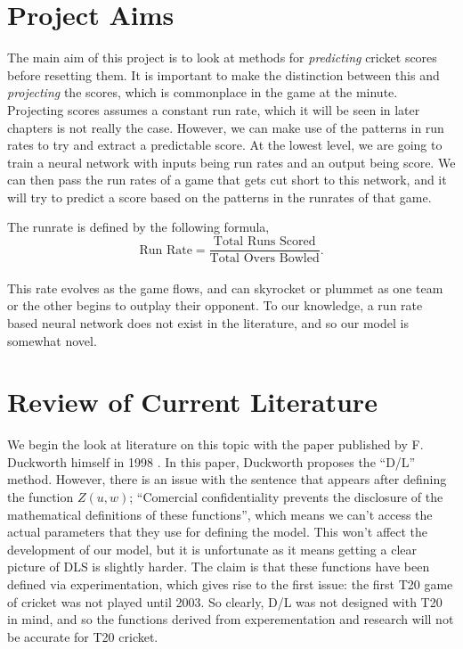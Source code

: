 \section{Project Aims}
The main aim of this project is to look at methods for \textit{predicting} cricket scores before resetting them. It is important to make the distinction between this 
and \textit{projecting} the scores, which is commonplace in the game at the minute. Projecting scores assumes a constant run rate, which it will be seen 
in later chapters is not really the case. However, we can make use of the patterns in run rates to try and extract a predictable score. At the lowest level,
we are going to train a neural network with inputs being run rates and an output being score. We can then pass the run rates of a game that gets cut short 
to this network, and it will try to predict a score based on the patterns in the runrates of that game.

The runrate is defined by the following formula, \\

\[
    \text{Run Rate}  = \frac{\text{Total Runs Scored}}{\text{Total Overs Bowled}}.
\]\\

This rate evolves as the game flows, and can skyrocket or plummet as one team or the other begins to outplay their opponent. To our knowledge, a run rate 
based neural network does not exist in the literature, and so our model is somewhat novel.

\section{Review of Current Literature}
We begin the look at literature on this topic with the paper published by F. Duckworth himself in 1998 \cite{duckworth}. In this paper, 
Duckworth proposes the ``D/L'' method. However, there is an issue with the sentence that appears after defining the function $Z(u,w)$;
``Comercial confidentiality prevents the disclosure of the mathematical definitions of these functions'', which means we can't access the actual parameters 
that they use for defining the model. This won't affect the development of our model, but it is unfortunate as it means getting a clear picture of DLS is slightly harder.
The claim is that these functions have been defined via experimentation, which gives rise to the first issue: the first T20 game of cricket was not played until 2003. 
So clearly, D/L was not designed with T20 in mind, and so the functions derived from experementation and research will not be accurate for T20 cricket. \\

